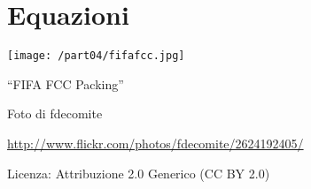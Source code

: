 \part{Equazioni}
\texttt{[image: /part04/fifafcc.jpg]}
  \begin{center}
    {\large ``FIFA FCC Packing''}\par
    Foto di fdecomite\par
    \url{http://www.flickr.com/photos/fdecomite/2624192405/}\par
    Licenza: Attribuzione 2.0 Generico (CC BY 2.0)\par
  \end{center}
\clearpage
\cleardoublepage

